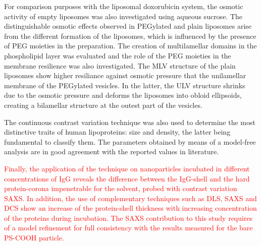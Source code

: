 For comparison purposes with the liposomal doxorubicin system, the osmotic activity of empty liposomes was also investigated using aqueous sucrose. The distinguishable osmotic effects observed in PEGylated and plain liposomes arise from the different formation of the liposomes, which is influenced by the presence of PEG moieties in the preparation. The creation of multilamellar domains in the phospholipid layer was evaluated and the role of the PEG moieties in the membrane resilience was also investigated. The MLV structure of the plain liposomes show higher resiliance against osmotic pressure that the unilamellar membrane of the PEGylated vesicles. In the latter, the ULV structure shrinks due to the osmotic pressure and deforms the liposomes into obloid ellipsoids, creating a bilamellar structure at the outest part of the vesicles.

The continuous contrast variation technique was also used to determine the most distinctive traits of human lipoproteins: size and density, the latter being fundamental to classify them. The parameters obtained by means of a model-free analysis are in good agreement with the reported values in literature.

\textcolor{red}{Finally, the application of the technique on nanoparticles incubated in different concentrations of IgG reveals the difference between the IgG-shell and the hard protein-corona impenetrable for the solvent, probed with contrast variation SAXS. In addition, the use of complementary techniques such as DLS, SAXS and DCS show an increase of the protein-shell thickness with increasing concentration of the proteins during incubation. The SAXS contribution to this study requires of a model refinement for full consistency with the results measured for the bare PS-COOH particle.}
